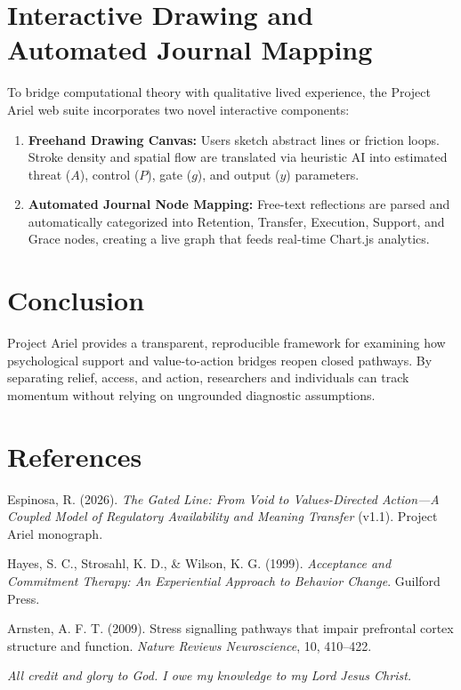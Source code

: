 \documentclass[11pt, a4paper]{article}
\begin{document}
\section{Interactive Drawing and Automated Journal Mapping}
To bridge computational theory with qualitative lived experience, the Project Ariel web suite incorporates two novel interactive components:
\begin{enumerate}
    \item \textbf{Freehand Drawing Canvas:} Users sketch abstract lines or friction loops. Stroke density and spatial flow are translated via heuristic AI into estimated threat ($A$), control ($P$), gate ($g$), and output ($y$) parameters.
    \item \textbf{Automated Journal Node Mapping:} Free-text reflections are parsed and automatically categorized into Retention, Transfer, Execution, Support, and Grace nodes, creating a live graph that feeds real-time Chart.js analytics.
\end{enumerate}

\section{Conclusion}
Project Ariel provides a transparent, reproducible framework for examining how psychological support and value-to-action bridges reopen closed pathways. By separating relief, access, and action, researchers and individuals can track momentum without relying on ungrounded diagnostic assumptions.

\section*{References}
\noindent [1] Espinosa, R. (2026). \textit{The Gated Line: From Void to Values-Directed Action---A Coupled Model of Regulatory Availability and Meaning Transfer} (v1.1). Project Ariel monograph.

\noindent [2] Hayes, S. C., Strosahl, K. D., \& Wilson, K. G. (1999). \textit{Acceptance and Commitment Therapy: An Experiential Approach to Behavior Change}. Guilford Press.

\noindent [3] Arnsten, A. F. T. (2009). Stress signalling pathways that impair prefrontal cortex structure and function. \textit{Nature Reviews Neuroscience}, 10, 410--422.

\vspace{1.5em}
\noindent\textit{All credit and glory to God. I owe my knowledge to my Lord Jesus Christ.}
\end{document}
